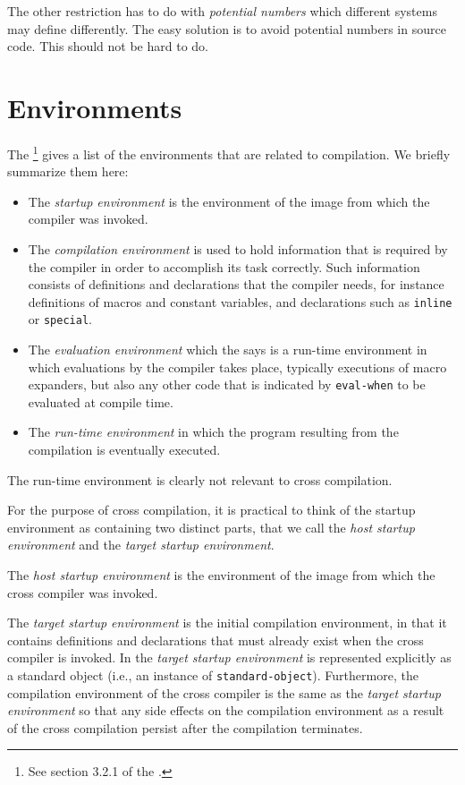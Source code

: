 The other restriction has to do with \emph{potential numbers} which
different systems may define differently.  The easy solution is to
avoid potential numbers in source code.  This should not be hard to
do. 

\section{Environments}

The \hs{}\footnote{See section 3.2.1 of the \hs{}.} gives a list of
the environments that are related to compilation.  We briefly
summarize them here:

\begin{itemize}
\item The \emph{startup environment} is the environment of the image
  from which the compiler was invoked.
\item The \emph{compilation environment} is used to hold information
  that is required by the compiler in order to accomplish its task
  correctly.  Such information consists of definitions and
  declarations that the compiler needs, for instance definitions of
  macros and constant variables,  and declarations such as
  \texttt{inline} or \texttt{special}. 
\item The \emph{evaluation environment} which the \hs{} says is a
  run-time environment in which evaluations by the compiler takes
  place, typically executions of macro expanders, but also any other
  code that is indicated by \texttt{eval-when} to be evaluated at
  compile time.
\item The \emph{run-time environment} in which the program resulting
  from the compilation is eventually executed.
\end{itemize}

The run-time environment is clearly not relevant to cross
compilation. 

For the purpose of cross compilation, it is practical to think of the
startup environment as containing two distinct parts, that we call the
\emph{host startup environment} and the \emph{target startup
  environment}.

The \emph{host startup environment} is the environment of the image
from which the cross compiler was invoked.

The \emph{target startup environment} is the initial compilation
environment, in that it contains definitions and declarations that
must already exist when the cross compiler is invoked.  In \sysname{}
the \emph{target startup environment} is represented explicitly as a
standard object (i.e., an instance of \texttt{standard-object}).
Furthermore, the compilation environment of the cross compiler is the
same as the \emph{target startup environment} so that any side effects
on the compilation environment as a result of the cross compilation
persist after the compilation terminates.  

